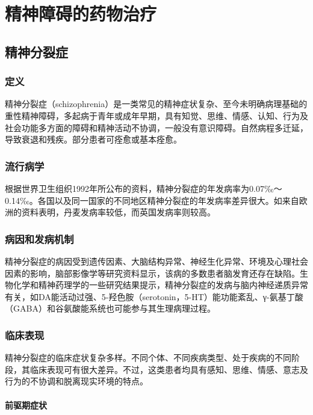 \chapter{精神障碍的药物治疗}

\section{精神分裂症}

\subsection{定义}

精神分裂症（schizophrenia）是一类常见的精神症状复杂、至今未明确病理基础的重性精神障碍，多起病于青年或成年早期，具有知觉、思维、情感、认知、行为及社会功能多方面的障碍和精神活动不协调，一般没有意识障碍。自然病程多迁延，导致衰退和残疾。部分患者可痊愈或基本痊愈。

\subsection{流行病学}

根据世界卫生组织1992年所公布的资料，精神分裂症的年发病率为0.07‰～0.14‰。各国以及同一国家的不同地区精神分裂症的年发病率差异很大。如来自欧洲的资料表明，丹麦发病率较低，而英国发病率则较高。

\subsection{病因和发病机制}

精神分裂症的病因受到遗传因素、大脑结构异常、神经生化异常、环境及心理社会因素的影响，脑部影像学等研究资料显示，该病的多数患者脑发育还存在缺陷。生物化学和精神药理学的一些研究结果提示，精神分裂症的发病与脑内神经递质异常有关，如DA能活动过强、5-羟色胺（serotonin，5-HT）能功能紊乱、γ-氨基丁酸（GABA）和谷氨酸能系统也可能参与其生理病理过程。

\subsection{临床表现}

精神分裂症的临床症状复杂多样。不同个体、不同疾病类型、处于疾病的不同阶段，其临床表现可有很大差异。不过，这类患者均具有感知、思维、情感、意志及行为的不协调和脱离现实环境的特点。

\subsubsection{前驱期症状}

